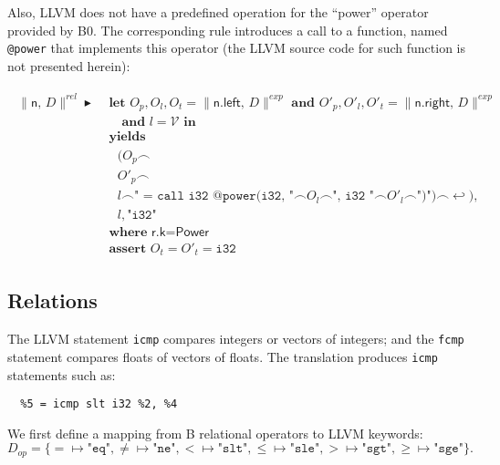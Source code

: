 \documentclass{article}
\newcommand{\trad}[2]{\ensuremath{\lVert \textsf{#1} \rVert^{\textit{#2}}}}
\newcommand{\nl}[0]{\ensuremath{\hookleftarrow}}
\DeclareMathOperator{\conc}{\smallfrown}
\DeclareMathOperator{\isdef}{\blacktriangleright}
\begin{document}
Also, LLVM does not have a predefined operation for the ``power''
operator provided by B0. The corresponding rule introduces a call
to a function, named \texttt{@power} that implements this operator (the LLVM source code
for such function is not presented herein):
\begin{framed}
\begin{align}
\begin{split}
  \trad{n, $D$}{rel} \isdef & \textbf{ let } O_p, O_l, O_t =
  \trad{n.left, $D$}{exp} \textbf{ and }
  O'_p, O'_l, O'_t = \trad{n.right, $D$}{exp} \\
  & \quad \textbf{ and } l = \mathcal{V} \textbf{ in } \\
  & \textbf{ yields} \\
  & \quad (O_p \conc \\
  & \quad O'_p \conc \\
  & \quad l \conc \texttt{" = call i32 @power(i32, "} \conc O_l \conc \texttt{", i32 "} \conc O'_l \conc \texttt{")"}) \conc \nl), \\
  & \quad l, \texttt{"i32"} \\
  & \textbf{ where } \textsf{r.k} = \textsf{Power} \\
  & \textbf{ assert } O_t = O'_t = \texttt{i32}
\end{split}
\end{align}
\end{framed}

\subsection{Relations}
\label{sec:rel}

The LLVM statement \texttt{icmp} compares integers or vectors of integers;
and the \texttt{fcmp} statement compares floats of vectors of floats. The
translation produces \texttt{icmp} statements such as:
\begin{verbatim}
  %5 = icmp slt i32 %2, %4
\end{verbatim}

We first define a mapping from B relational operators to LLVM
keywords:
$$D_{op} = \{ = \mapsto \texttt{"eq"}, 
  \ne \mapsto \texttt{"ne"}, 
  < \mapsto \texttt{"slt"}, 
  \le \mapsto \texttt{"sle"}, 
  > \mapsto \texttt{"sgt"}, 
  \ge \mapsto \texttt{"sge"} \}.$$
\end{document}
